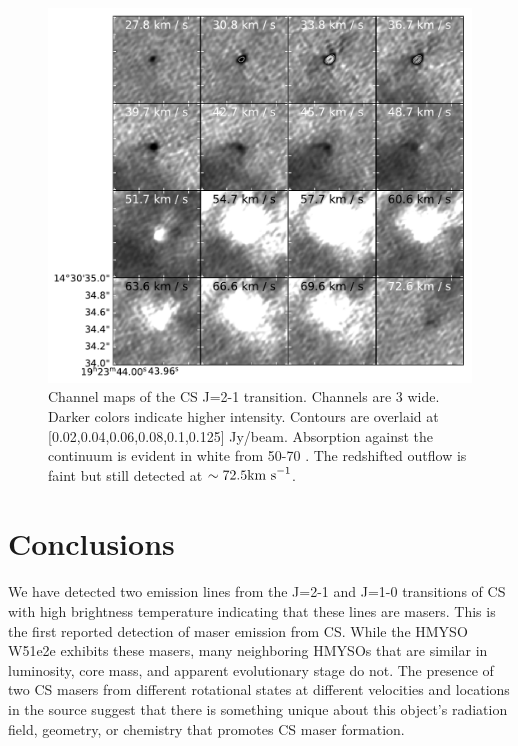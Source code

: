 \documentclass[twocolumn]{aastex62}
\begin{document}

\begin{figure}
    \includegraphics[]{figures/CS_maser_channel_maps.pdf}
    \caption{Channel maps of the CS J=2-1 transition.  Channels are 3 \kms
    wide.  Darker colors indicate higher intensity.  Contours are overlaid at
    [0.02,0.04,0.06,0.08,0.1,0.125] Jy/beam.  Absorption against the continuum
    is evident in white from 50-70 \kms.  The redshifted outflow is faint but still
    detected at
    $\sim72.5\textrm{km~s}^{-1}$.
    }
    \label{fig:channelmaps}
\end{figure}

\section{Conclusions}
We have detected two emission lines from the J=2-1 and J=1-0 transitions of CS
with high brightness temperature indicating that these lines are masers.
This is the first reported detection of maser emission from CS.
While the HMYSO W51e2e exhibits these masers, many neighboring HMYSOs that
are similar in luminosity, core mass, and apparent evolutionary stage
do not.  The presence of two CS masers from different rotational states
at different velocities and locations in the source suggest that there is something
unique about this object's radiation field, geometry, or chemistry that
promotes CS maser formation.
\end{document}
